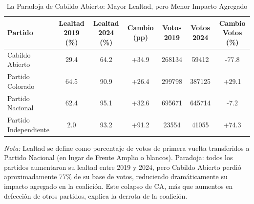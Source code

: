 \begin{table}[htbp]
\centering
\caption{La Paradoja de Cabildo Abierto: Mayor Lealtad, pero Menor Impacto Agregado}
\label{tab:paradox}
\small
\begin{tabular}{lcccccc}
\toprule
{\textbf{Partido}} & {\textbf{Lealtad 2019 (\%)}} & {\textbf{Lealtad 2024 (\%)}} & {\textbf{Cambio (pp)}} & {\textbf{Votos 2019}} & {\textbf{Votos 2024}} & {\textbf{Cambio Votos (\%)}} \\
\midrule
Cabildo Abierto & 29.4 & 64.2 & +34.9 & 268134 & 59412 & -77.8 \\
Partido Colorado & 64.5 & 90.9 & +26.4 & 299798 & 387125 & +29.1 \\
Partido Nacional & 62.4 & 95.1 & +32.6 & 695671 & 645714 & -7.2 \\
Partido Independiente & 2.0 & 93.2 & +91.2 & 23554 & 41055 & +74.3 \\
\bottomrule
\end{tabular}
\begin{flushleft}
\small \textit{Nota:} Lealtad se define como porcentaje de votos de primera vuelta transferidos a Partido Nacional (en lugar de Frente Amplio o blancos). Paradoja: todos los partidos aumentaron su lealtad entre 2019 y 2024, pero Cabildo Abierto perdió aproximadamente 77\% de su base de votos, reduciendo dramáticamente su impacto agregado en la coalición. Este colapso de CA, más que aumentos en defección de otros partidos, explica la derrota de la coalición.
\end{flushleft}
\end{table}

